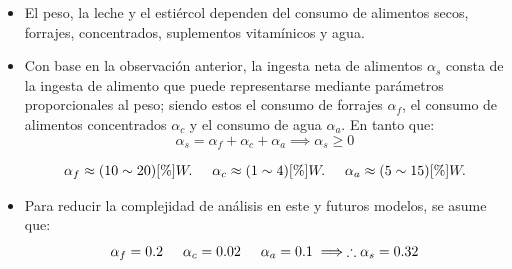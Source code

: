 \begin{itemize}
    \item El peso, la leche y el estiércol dependen del consumo de alimentos secos, forrajes, concentrados, suplementos vitamínicos y agua.
    \item Con base en la observación anterior, la ingesta neta de alimentos $\alpha_{s}$ consta de la ingesta de alimento que puede representarse mediante parámetros proporcionales al peso; siendo estos el consumo de forrajes $\alpha_{f}$, el consumo de alimentos concentrados $\alpha_{c}$ y el consumo de agua $\alpha_{a}$. En tanto que:
    \begin{equation}
        \alpha_{s} = \alpha_{f} + \alpha_{c} + \alpha_{a} \implies \alpha_{s} \geq 0
    \end{equation}

    \begin{equation*}
        \alpha_{f} \approx (10\sim 20)[\%]W. \hspace{0.5cm} \alpha_{c} \approx (1\sim 4)[\%]W. \hspace{0.5cm} \alpha_{a} \approx (5\sim 15)[\%]W.
    \end{equation*}

    \item Para reducir la complejidad de análisis en este y futuros modelos, se asume que:
    \begin{equation*}
       \alpha_{f} = 0.2 \hspace{0.5cm} \alpha_{c} = 0.02 \hspace{0.5cm} \alpha_{a} = 0.1 \implies \therefore \alpha_{s} = 0.32 
    \end{equation*}
    
\end{itemize}

